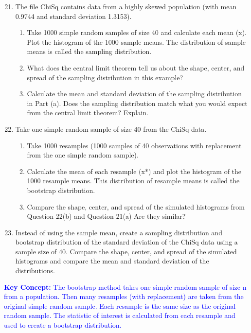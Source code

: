 \documentclass[
]{report}
\begin{document}
\begin{enumerate}
 \setcounter{enumi}{20}
 \item The file ChiSq contains data from a highly skewed population (with mean 0.9744 and standard
deviation 1.3153).
\begin{enumerate}
  \item Take 1000 simple random samples of size 40 and calculate each mean (x). Plot the histogram of the 1000 sample means. The distribution of sample means is called the sampling distribution.

  \item What does the central limit theorem tell us about the shape, center, and spread of the sampling distribution in this example?

  \item Calculate the mean and standard deviation of the sampling distribution in Part (a). Does the sampling distribution match what you would expect from the central limit theorem? Explain.
\end{enumerate}


\item Take one simple random sample of size 40 from the ChiSq data.

\begin{enumerate}
  \item Take 1000 resamples (1000 samples of 40 observations with replacement from the one simple random sample).

  \item Calculate the mean of each resample (x*) and plot the histogram of the 1000 resample means. This distribution of resample means is called the bootstrap distribution.

  \item Compare the shape, center, and spread of the simulated histograms from Question 22(b) and Question 21(a) Are they similar?

\end{enumerate}

\item Instead of using the sample mean, create a sampling distribution and bootstrap distribution of the standard deviation of the ChiSq data using a sample size of 40. Compare the shape, center, and spread of the simulated histograms and compare the mean and standard deviation of the distributions.
\end{enumerate}

\textbf{\textcolor{blue}{Key Concept:}}
\textcolor{blue}{The bootstrap method takes one simple random sample of size n from a population. Then many resamples (with replacement) are taken from the original simple random sample. Each resample is the same size as the original random sample. The statistic of interest is calculated from each resample and used to create a bootstrap distribution.}
\end{document}
